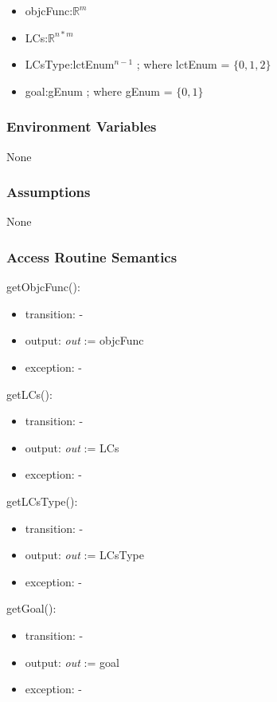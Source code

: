 \documentclass[12pt, titlepage]{article}
\begin{document}
\begin{itemize}
	\item objcFunc:$\mathbb{R} ^m$
	\item LCs:$\mathbb{R} ^{n*m}$
	\item LCsType:lctEnum$^{n-1}$ ; where lctEnum = $\{0,1,2\}$
	\item goal:gEnum ; where gEnum = $\{0,1\}$
\end{itemize}

\subsubsection{Environment Variables}

None

\subsubsection{Assumptions}

None

\subsubsection{Access Routine Semantics}

\noindent 
getObjcFunc():
\begin{itemize}
	\item transition: -
	\item output: \textit{out} := objcFunc
	\item exception: -
\end{itemize}

\noindent 
getLCs():
\begin{itemize}
	\item transition: -
	\item output: \textit{out} := LCs
	\item exception: -
\end{itemize}

\noindent 
getLCsType():
\begin{itemize}
	\item transition: -
	\item output: \textit{out} := LCsType
	\item exception: -
\end{itemize}

\noindent 
getGoal():
\begin{itemize}
	\item transition: -
	\item output: \textit{out} := goal
	\item exception: -
\end{itemize}
\end{document}
